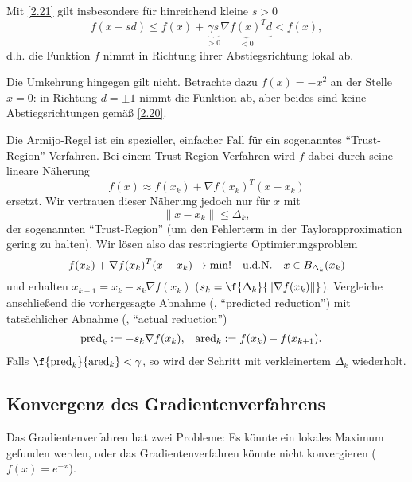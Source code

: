 \begin{nt} \label{2.22}
	Mit \ref{2.21} gilt insbesondere für hinreichend kleine $s > 0$
	\[
		f(x+sd)
		\le f(x) + \underbrace{\gamma s}_{> 0} \underbrace{\nabla f(x)^T d}_{<0}
		< f(x),
	\]
	d.h. die Funktion $f$ nimmt in Richtung ihrer Abstiegsrichtung lokal ab.

	Die Umkehrung hingegen gilt nicht.
	Betrachte dazu $f(x) = -x^2$ an der Stelle $x = 0$: in Richtung $d=\pm 1$ nimmt die Funktion ab, aber beides sind keine Abstiegsrichtungen gemäß \ref{2.20}.
\end{nt}

\begin{nt} \label{2.23}
	Die Armijo-Regel ist ein spezieller, einfacher Fall für ein sogenanntes “Trust-Region”-Verfahren.
	Bei einem Trust-Region-Verfahren wird $f$ dabei durch seine lineare Näherung
	\[
		f(x)
		\approx f(x_k) + \nabla f(x_k)^T (x-x_k)
	\]
	ersetzt.
	Wir vertrauen dieser Näherung jedoch nur für $x$ mit
	\[
		\|x - x_k\| \le \Delta_k,
	\]
	der sogenannten “Trust-Region” (um den Fehlerterm in der Taylorapproximation gering zu halten).
	Wir lösen also das restringierte Optimierungsproblem
	\[
		f(x_k) + \nabla f(x_k)^T (x-x_k) \to \min!
		\quad\text{u.d.N.}\quad
		x \in B_{\Delta_k}(x_k)
	\]
	und erhalten $x_{k+1} = x_k - s_k \nabla f(x_k)$ ($s_k = \f {\Delta_k}{\|\nabla f(x_k)\|}$).
	Vergleiche anschließend die vorhergesagte Abnahme (\pred, “predicted reduction”) mit tatsächlicher Abnahme (\ared, “actual reduction”)
	\begin{align*}
		\text{pred}_k &:= -s_k \nabla f(x_k), &
		\text{ared}_k &:= f(x_k) - f(x_{k+1}).
	\end{align*}
	Falls $\f {\pred_k}{\ared_k} < \gamma$, so wird der Schritt mit verkleinertem $\Delta_k$ wiederholt.
\end{nt}


\subsection{Konvergenz des Gradientenverfahrens}

Das Gradientenverfahren hat zwei Probleme:
Es könnte ein lokales Maximum gefunden werden, oder das Gradientenverfahren könnte nicht konvergieren ($f(x) = e^{-x}$).

